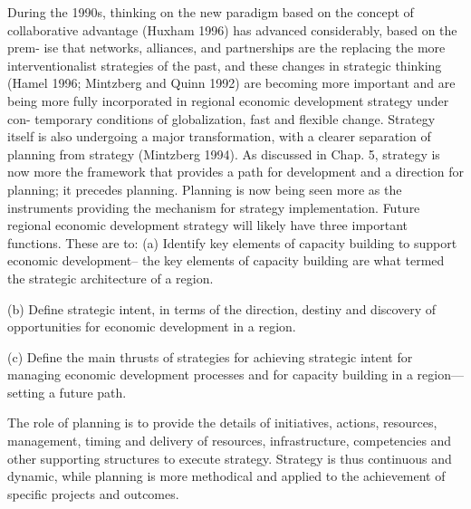 During the 1990s, thinking on the new paradigm based on the concept of collaborative advantage (Huxham 1996) has advanced considerably, based on the prem- ise that networks, alliances, and partnerships are the replacing the more interventionalist strategies of the past, and these changes in strategic thinking (Hamel 1996; Mintzberg and Quinn 1992) are becoming more important and are being more fully incorporated in regional economic development strategy under con- temporary conditions of globalization, fast and flexible change. Strategy itself is also undergoing a major transformation, with a clearer separation of planning from strategy (Mintzberg 1994). As discussed in Chap. 5, strategy is now more the framework that provides a path for development and a direction for planning; it precedes planning. Planning is now being seen more as the instruments providing the mechanism for strategy implementation. Future regional economic development strategy will likely have three important functions. These are to:
(a) Identify key elements of capacity building to support economic development– the key elements of capacity building are what termed the strategic architecture of a region. \par
(b) Define strategic intent, in terms of the direction, destiny and discovery of opportunities for economic development in a region. \par
(c) Define the main thrusts of strategies for achieving strategic intent for managing economic development processes and for capacity building in a region—setting a future path. \par
The role of planning is to provide the details of initiatives, actions, resources, management, timing and delivery of resources, infrastructure, competencies and other supporting structures to execute strategy. Strategy is thus continuous and dynamic, while planning is more methodical and applied to the achievement of specific projects and outcomes.


